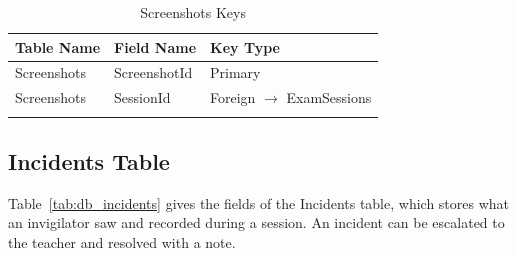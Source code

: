 {\small
\begin{longtable}{>{\raggedright\arraybackslash}p{4.0cm}>{\raggedright\arraybackslash}p{4.6cm}>{\raggedright\arraybackslash}p{4.6cm}}
\caption{Screenshots Keys}\label{tab:keys_screenshots}\\
\hline\hline
\textbf{Table Name} & \textbf{Field Name} & \textbf{Key Type} \\ \hline
\endfirsthead
\hline\hline
\endlastfoot
Screenshots & ScreenshotId & Primary \\*
Screenshots & SessionId & Foreign $\rightarrow$ ExamSessions \\*
\end{longtable}
}

\par\ifdim\dimexpr\pagegoal-\pagetotal\relax<376pt\newpage\fi
\subsection{Incidents Table}
Table~\ref{tab:db_incidents} gives the fields of the Incidents table, which stores what an invigilator saw and recorded during a session. An incident can be escalated to the teacher and resolved with a note.

